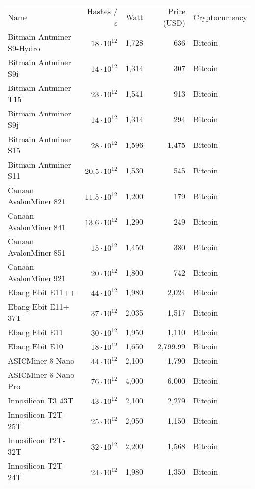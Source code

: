 \begin{longtable}{|p{}|r|r|r|p{}|}
    \hline
    Name & Hashes / s & Watt & Price (USD) & Cryptocurrency\\
    \hhline{|=|=|=|=|=|}
  \hline
  Bitmain Antminer S9-Hydro &    $18 \cdot 10^{12}$ & 1,728 & 636 & Bitcoin \\
  Bitmain Antminer S9i &         $14 \cdot 10^{12}$ & 1,314 & 307 & Bitcoin \\
  Bitmain Antminer T15 &         $23 \cdot 10^{12}$ & 1,541 & 913 & Bitcoin \\
  Bitmain Antminer S9j &         $14 \cdot 10^{12}$ & 1,314 & 294 & Bitcoin \\
  Bitmain Antminer S15 &         $28 \cdot 10^{12}$ & 1,596 & 1,475 & Bitcoin \\
  Bitmain Antminer S11 &         $20.5 \cdot 10^{12}$ & 1,530 & 545 & Bitcoin \\
  Canaan AvalonMiner 821 &       $11.5 \cdot 10^{12}$ & 1,200 & 179 & Bitcoin \\
  Canaan AvalonMiner 841 &       $13.6 \cdot 10^{12}$ & 1,290 & 249 & Bitcoin \\
  Canaan AvalonMiner 851 &       $15 \cdot 10^{12}$ & 1,450 & 380 & Bitcoin \\
  Canaan AvalonMiner 921 &       $20 \cdot 10^{12}$ & 1,800 & 742 & Bitcoin \\
  Ebang Ebit E11++ &             $44 \cdot 10^{12}$ & 1,980 & 2,024 & Bitcoin \\
  Ebang Ebit E11+ 37T &          $37 \cdot 10^{12}$ & 2,035 & 1,517 & Bitcoin \\
  Ebang Ebit E11 &               $30 \cdot 10^{12}$ & 1,950 & 1,110 & Bitcoin \\
  Ebang Ebit E10 &               $18 \cdot 10^{12}$ & 1,650 & 2,799.99 & Bitcoin \\
  ASICMiner 8 Nano &             $44 \cdot 10^{12}$ & 2,100 & 1,790 & Bitcoin \\
  ASICMiner 8 Nano Pro &         $76 \cdot 10^{12}$ & 4,000 & 6,000 & Bitcoin \\
  Innosilicon T3 43T &           $43 \cdot 10^{12}$ & 2,100 & 2,279 & Bitcoin \\
  Innosilicon T2T-25T &          $25 \cdot 10^{12}$ & 2,050 & 1,150 & Bitcoin \\
  Innosilicon T2T-32T &          $32 \cdot 10^{12}$ & 2,200 & 1,568 & Bitcoin \\
  Innosilicon T2T-24T &          $24 \cdot 10^{12}$ & 1,980 & 1,350 & Bitcoin \\

\end{longtable}
